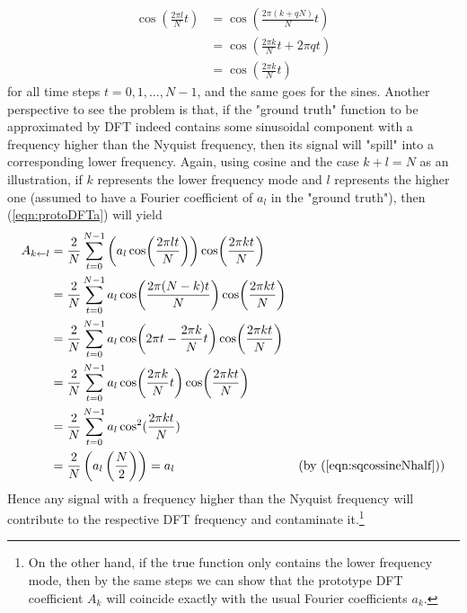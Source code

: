 \begin{align}
\cos(\frac{2\pi l}{N} t) &= \cos(\frac{2\pi (k + qN)}{N} t) \nonumber \\
&= \cos(\frac{2\pi k}{N} t + 2\pi q t) \nonumber \\
&= \cos(\frac{2\pi k}{N} t)
\end{align}
for all time steps $t = 0,1,\ldots,N-1$, and the same goes for the sines. Another perspective to see the problem is that, if the "ground truth" function to be approximated by DFT indeed contains some sinusoidal component with a frequency higher than the Nyquist frequency, then its signal will "spill" into a corresponding lower frequency. Again, using cosine and the case $k + l = N$ as an illustration, if $k$ represents the lower frequency mode and $l$ represents the higher one (assumed to have a Fourier coefficient of $a_l$ in the "ground truth"), then (\ref{eqn:protoDFTa}) will yield
\begin{align}
A_{k \leftarrow l} &= \frac{2}{N}\sum_{t=0}^{N-1} \left(a_l\cos(\frac{2\pi lt}{N})\right) \cos(\frac{2\pi kt}{N})\nonumber \\
&= \frac{2}{N}\sum_{t=0}^{N-1} a_l\cos(\frac{2\pi (N-k)t}{N}) \cos(\frac{2\pi kt}{N})\nonumber \\
&= \frac{2}{N}\sum_{t=0}^{N-1} a_l\cos(2\pi t - \frac{2\pi k}{N} t) \cos(\frac{2\pi kt}{N})\nonumber \\
&= \frac{2}{N}\sum_{t=0}^{N-1} a_l\cos(\frac{2\pi k}{N} t) \cos(\frac{2\pi kt}{N}) \nonumber \\
&= \frac{2}{N}\sum_{t=0}^{N-1} a_l \cos^2(\frac{2\pi kt}{N}) \nonumber \\
&= \frac{2}{N} \left(a_l \left(\frac{N}{2}\right)\right) = a_l & \text{(by (\ref{eqn:sqcossineNhalf}))} 
\end{align}
Hence any signal with a frequency higher than the Nyquist frequency will contribute to the respective DFT frequency and contaminate it.\footnote{On the other hand, if the true function only contains the lower frequency mode, then by the same steps we can show that the prototype DFT coefficient $A_k$ will coincide exactly with the usual Fourier coefficients $a_k$.}\par

